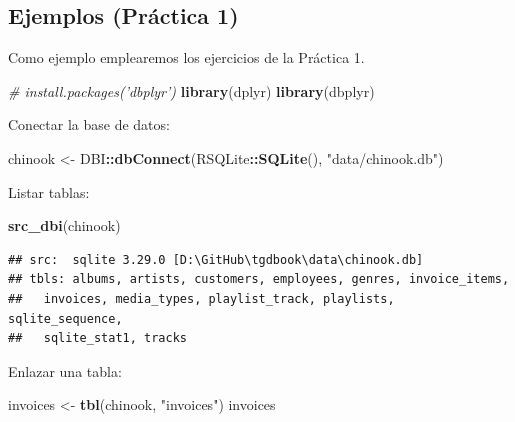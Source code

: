 \documentclass[]{book}
\newenvironment{Shaded}{\begin{snugshade}}{\end{snugshade}}
\newcommand{\KeywordTok}[1]{\textcolor[rgb]{0.13,0.29,0.53}{\textbf{#1}}}
\newcommand{\StringTok}[1]{\textcolor[rgb]{0.31,0.60,0.02}{#1}}
\newcommand{\CommentTok}[1]{\textcolor[rgb]{0.56,0.35,0.01}{\textit{#1}}}
\newcommand{\OperatorTok}[1]{\textcolor[rgb]{0.81,0.36,0.00}{\textbf{#1}}}
\newcommand{\NormalTok}[1]{#1}
\begin{document}
\subsection{Ejemplos (Práctica 1)}\label{ejemplos-practica-1}

Como ejemplo emplearemos los ejercicios de la Práctica 1.

\begin{Shaded}
\begin{Highlighting}[]
\CommentTok{# install.packages('dbplyr')}
\KeywordTok{library}\NormalTok{(dplyr)}
\KeywordTok{library}\NormalTok{(dbplyr)}
\end{Highlighting}
\end{Shaded}

Conectar la base de datos:

\begin{Shaded}
\begin{Highlighting}[]
\NormalTok{chinook <-}\StringTok{ }\NormalTok{DBI}\OperatorTok{::}\KeywordTok{dbConnect}\NormalTok{(RSQLite}\OperatorTok{::}\KeywordTok{SQLite}\NormalTok{(), }\StringTok{"data/chinook.db"}\NormalTok{)}
\end{Highlighting}
\end{Shaded}

Listar tablas:

\begin{Shaded}
\begin{Highlighting}[]
\KeywordTok{src_dbi}\NormalTok{(chinook)}
\end{Highlighting}
\end{Shaded}

\begin{verbatim}
## src:  sqlite 3.29.0 [D:\GitHub\tgdbook\data\chinook.db]
## tbls: albums, artists, customers, employees, genres, invoice_items,
##   invoices, media_types, playlist_track, playlists, sqlite_sequence,
##   sqlite_stat1, tracks
\end{verbatim}

Enlazar una tabla:

\begin{Shaded}
\begin{Highlighting}[]
\NormalTok{invoices <-}\StringTok{ }\KeywordTok{tbl}\NormalTok{(chinook, }\StringTok{"invoices"}\NormalTok{)}
\NormalTok{invoices}
\end{Highlighting}
\end{Shaded}
\end{document}

